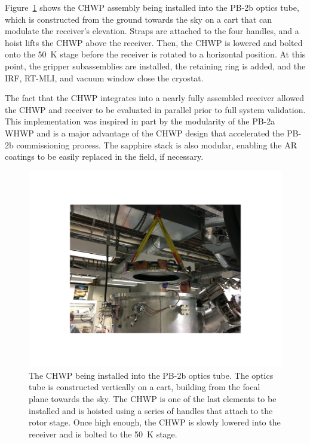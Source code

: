 Figure~\ref{fig:pb2b_chwp_installation} shows the CHWP assembly being installed into the PB-2b optics tube, which is constructed from the ground towards the sky on a cart that can modulate the receiver's elevation. Straps are attached to the four handles, and a hoist lifts the CHWP above the receiver. Then, the CHWP is lowered and bolted onto the 50~K stage before the receiver is rotated to a horizontal position. At this point, the gripper subassemblies are installed, the retaining ring is added, and the IRF, RT-MLI, and vacuum window close the cryostat. 

The fact that the CHWP integrates into a nearly fully assembled receiver allowed the CHWP and receiver to be evaluated in parallel prior to full system validation. This implementation was inspired in part by the modularity of the PB-2a WHWP and is a major advantage of the CHWP design that accelerated the PB-2b commissioning process. The sapphire stack is also modular, enabling the AR coatings to be easily replaced in the field, if necessary.

\begin{figure}[!t]
    \centering
    \includegraphics[width=0.7\linewidth, trim=4cm 4cm 4cm 4cm, clip]{CHWPDesign/Figures/pb2b_chwp_integration.pdf}
    \caption{The CHWP being installed into the PB-2b optics tube. The optics tube is constructed vertically on a cart, building from the focal plane towards the sky. The CHWP is one of the last elements to be installed and is hoisted using a series of handles that attach to the rotor stage. Once high enough, the CHWP is slowly lowered into the receiver and is bolted to the 50~K stage.}
    \label{fig:pb2b_chwp_installation}
\end{figure}